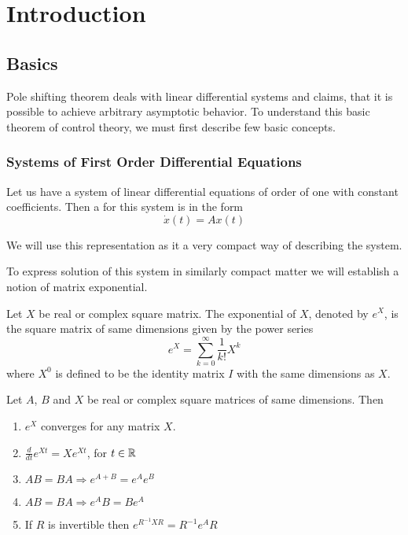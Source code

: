 \chapter{Introduction}
\label{chap:intr}

\section{Basics}
\label{sec:basics}

Pole shifting theorem deals with linear differential systems and claims, that it is possible to achieve arbitrary asymptotic behavior. To understand this basic theorem of control theory, we must first describe few basic concepts.

\subsection{Systems of First Order Differential Equations}

\begin{definition}
	Let us have a system of linear differential equations of order of one with constant coefficients. Then a  for this system is in the form $$\dot{x}(t)=Ax(t)$$ 
\end{definition}

We will use this representation as it a very compact way of describing the system.

To express solution of this system in similarly compact matter we will establish a notion of matrix exponential.

\begin{definition}
	Let $X$ be real or complex square matrix. The exponential of $X$, denoted by $e^X$, is the square matrix of same dimensions given by the power series $$e^{X}=\sum _{k=0}^{\infty}\frac{1}{k!}X^{k}$$
	where $X^0$ is defined to be the identity matrix $I$ with the same dimensions as $X$.
\end{definition}

\begin{remark}
\label{rem:expprop}
	Let $A$, $B$ and $X$ be real or complex square matrices of same dimensions. Then 
	\begin{enumerate}
		\item $e^X$ converges for any matrix $X$.
		\item $\frac{d}{dt}e^{Xt}=Xe^{Xt}$, for $t \in \mathbb{R}$
		\item $AB = BA \Rightarrow e^{A+B} = e^{A}e^B$
		\item $AB = BA \Rightarrow e^{A}B = Be^{A}$
		\item If $R$ is invertible then $e^{R^{-1}XR}=R^{-1}e^AR$
	\end{enumerate}
\end{remark}

